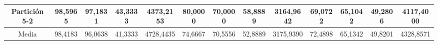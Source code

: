 \documentclass[12pt]{article}
\begin{document}
\begin{table}[H]
{\begin{tabular}{|c|cccc|cccc|cccc|}
Partición 5-2 & \multicolumn{1}{c|}{98,5965}                                                  & \multicolumn{1}{c|}{97,1831}                                                 & \multicolumn{1}{c|}{43,3333} & 4373,2153 & \multicolumn{1}{c|}{80,0000}                                                  & \multicolumn{1}{c|}{70,0000}                                                 & \multicolumn{1}{c|}{58,8889} & 3164,9642 & \multicolumn{1}{c|}{69,0722}                                                  & \multicolumn{1}{c|}{65,1042}                                                 & \multicolumn{1}{c|}{49,2806} & 4117,4000 \\ \hline
Media         & \multicolumn{1}{c|}{98,4183}                                                  & \multicolumn{1}{c|}{96,0638}                                                 & \multicolumn{1}{c|}{41,3333} & 4728,4435 & \multicolumn{1}{c|}{74,6667}                                                  & \multicolumn{1}{c|}{70,5556}                                                 & \multicolumn{1}{c|}{52,8889} & 3175,9390 & \multicolumn{1}{c|}{72,4898}                                                  & \multicolumn{1}{c|}{65,1342}                                                 & \multicolumn{1}{c|}{49,8201} & 4328,8571 \\ \hline
\end{tabular}}
\end{table}
\end{document}
